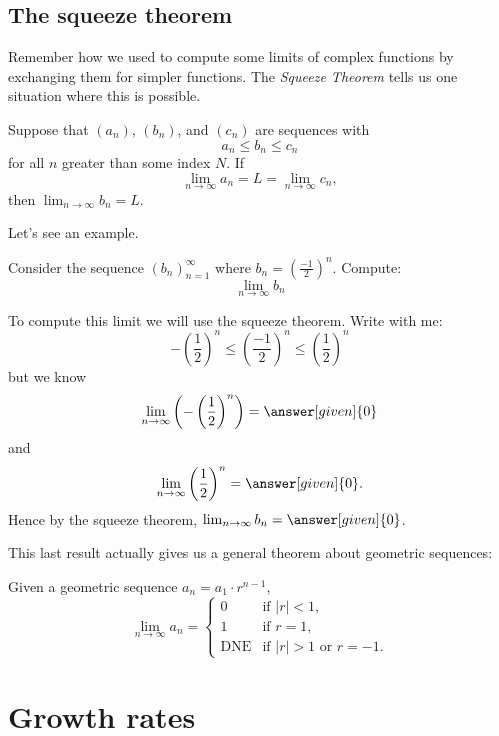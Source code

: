 \documentclass{ximera}
\begin{document}
\subsection{The squeeze theorem}

Remember how we used to compute some limits of complex functions by
exchanging them for simpler functions. The \textit{Squeeze Theorem}
tells us one situation where this is possible.

\begin{theorem}
  Suppose that $(a_n)$, $(b_n)$, and $(c_n)$ are sequences with
  \[
  a_n \le b_n \le c_n
  \]
  for all $n$ greater than some index $N$. If
  \[
  \lim_{n\to\infty} a_n = L = \lim_{n\to\infty} c_n,
  \] 
  then $\lim_{n\to\infty} b_n = L$.
\end{theorem}

Let's see an example.

\begin{example}
  Consider the sequence $(b_n)_{n=1}^{\infty}$ where $b_n =
  \left(\frac{-1}{2}\right)^n$. Compute:
  \[
  \lim_{n\to\infty}b_n
  \]
  \begin{explanation}
    To compute this limit we will use the squeeze theorem. Write with
    me:
    \[
    -\left(\frac{1}{2}\right)^n\le \left(\frac{-1}{2}\right)^n \le \left(\frac{1}{2}\right)^n
    \]
    but we know
    \[
    \lim_{n\to \infty}\left(-\left(\frac{1}{2}\right)^n\right) = \answer[given]{0}
    \]
    and
    \[
    \lim_{n\to \infty}\left(\frac{1}{2}\right)^n =\answer[given]{0}.
    \]
    Hence by the squeeze theorem, $\lim_{n\to\infty} b_n = \answer[given]{0}$.
  \end{explanation}
\end{example}


This last result actually gives us a general theorem about geometric
sequences:

\begin{theorem}
  Given a geometric sequence $a_n = a_1 \cdot r^{n-1}$,
  \[
  \lim_{n\to\infty} a_n =
  \begin{cases}
    0 &\text{if $|r|<1$,}\\
    1 &\text{if $r=1$,}\\
    \text{DNE} &\text{if $|r|>1$ or $r=-1$.}
  \end{cases}
  \]
\end{theorem}


\section{Growth rates}
\end{document}
